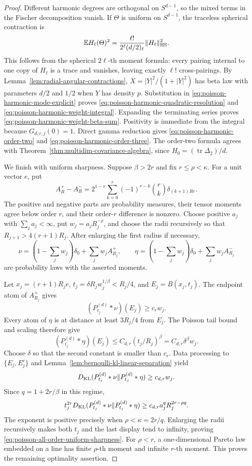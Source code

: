 \begin{proof}
Different harmonic degrees are orthogonal on \(S^{d-1}\), so the mixed
terms in the Fischer decomposition vanish.  If \(\Theta\) is uniform on
\(S^{d-1}\), the traceless spherical contraction is
\[
 \mathbb{E} H_\ell(\Theta)^2
 =\frac{\ell!}{2^\ell(d/2)_\ell}\|H_\ell\|_{\rm HS}^2.
\]
This follows from the spherical \(2\ell\)-th moment formula: every pairing
internal to one copy of \(H_\ell\) is a trace and vanishes, leaving exactly
\(\ell!\) cross-pairings.  By
Lemma~\ref{lem:radial-angular-contractions},
\(X=|Y|^2/(1+|Y|^2)\) has beta law with parameters \(d/2\) and \(1/2\)
when \(Y\) has density \(p\).  Substitution in
\eqref{eq:poisson-harmonic-mode-explicit} proves
\eqref{eq:poisson-harmonic-quadratic-resolution} and
\eqref{eq:poisson-harmonic-weight-integral}.  Expanding the terminating
series proves \eqref{eq:poisson-harmonic-weight-beta-sum}.  Positivity is
immediate from the integral because \(G_{d,r,j}(0)=1\).  Direct gamma
reduction gives \eqref{eq:poisson-harmonic-order-two} and
\eqref{eq:poisson-harmonic-order-three}.  The order-two formula agrees with
Theorem~\ref{thm:multidim-covariance-algebra}, since
\(H_0=(\operatorname{tr}\Delta_2)/d\).

We finish with uniform sharpness.  Suppose \(\beta>2r\) and fix
\(r\le\rho<\kappa\).  For a unit vector \(e\), put
\[
 A_R^+-A_R^-=2^{1-r}\sum_{k=0}^r(-1)^{r-k}\binom rk
 \delta_{(k+1)Re}.
\]
The positive and negative parts are probability measures, their tensor
moments agree below order \(r\), and their order-\(r\) difference is
nonzero.  Choose positive \(a_j\) with \(\sum_ja_j<\infty\), put
\(w_j=a_jR_j^{-\rho}\), and choose the radii recursively so that
\(R_{j+1}>4(r+1)R_j\).  After enlarging the first radius if necessary,
\[
 \nu=\left(1-\sum_jw_j\right)\delta_0+\sum_jw_jA_{R_j}^+,
 \qquad
 \eta=\left(1-\sum_jw_j\right)\delta_0+\sum_jw_jA_{R_j}^-
\]
are probability laws with the asserted moments.

Let \(x_j=(r+1)R_je\),
\(t_j=\delta R_jw_j^{1/\beta}<R_j/4\), and
\(E_j=B(x_j,t_j)\).  The endpoint atom of \(A_{R_j}^+\) gives
\[
 (P_{t_j}^{(d)}*\nu)(E_j)\ge c_rw_j.
\]
Every atom of \(\eta\) is at distance at least \(3R_j/4\) from \(E_j\).
The Poisson tail bound and scaling therefore give
\[
 (P_{t_j}^{(d)}*\eta)(E_j)
 \le C_{d,r}(t_j/R_j)^\beta=C_{d,r}\delta^\beta w_j.
\]
Choose \(\delta\) so that the second constant is smaller than \(c_r\).
Data processing to \(\{E_j,E_j^c\}\) and
Lemma~\ref{lem:bernoulli-kl-linear-separation} yield
\[
 D_{\rm KL}(P_{t_j}^{(d)}*\nu\|P_{t_j}^{(d)}*\eta)\ge c_{d,r}w_j.
\]
Since \(q=1+2r/\beta\) in this regime,
\[
 t_j^{2r}D_{\rm KL}(P_{t_j}^{(d)}*\nu\|P_{t_j}^{(d)}*\eta)
 \ge c_{d,r}a_j^qR_j^{2r-\rho q}.
\]
The exponent is positive precisely when \(\rho<\kappa=2r/q\).
Enlarging the radii recursively makes both \(t_j\) and the last display
tend to infinity, proving \eqref{eq:poisson-all-order-uniform-sharpness}.
For \(\rho<r\), a one-dimensional Pareto law embedded on a line has finite
\(\rho\)-th moment and infinite \(r\)-th moment.  This proves the remaining
optimality assertion.
\end{proof}
